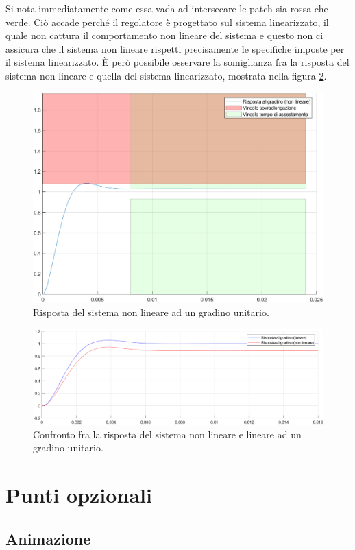 \documentclass[a4paper, 11pt]{article}
\begin{document}
Si nota immediatamente come essa vada ad intersecare le patch sia rossa che verde. Ciò accade perché il regolatore è progettato sul sistema linearizzato, il quale non cattura il comportamento non lineare del sistema
e questo non ci assicura che il sistema non lineare rispetti precisamente le specifiche imposte per il sistema linearizzato.
\`E però possibile osservare la somiglianza fra la risposta del sistema non lineare e quella del sistema linearizzato, mostrata nella figura \ref*{fig:confronto}.

\begin{figure}[h!]
	\centering
	\includegraphics[width=0.75\linewidth]{./images/stepRespNonLinUni.png}
	\caption{Risposta del sistema non lineare ad un gradino unitario.}
	\label{fig:step_response_non_lin_uni}
\end{figure}

\begin{figure}[h!]
	\centering
	\includegraphics[width=0.75\linewidth]{./images/confronto.png}
	\caption{Confronto fra la risposta del sistema non lineare e lineare ad un gradino unitario.}
	\label{fig:confronto}
\end{figure}

\section{Punti opzionali}

\subsection{Animazione}
\end{document}
